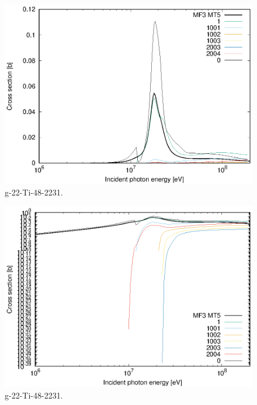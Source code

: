 \begin{figure}
 \includegraphics[width=\linewidth]{eps/g_22-Ti-48_2231.eps}
  \caption{g-22-Ti-48-2231.}
\end{figure}
\begin{figure}
 \includegraphics[width=\linewidth]{eps-log/g_22-Ti-48_2231.eps}
 \caption{g-22-Ti-48-2231.}
\end{figure}
\newpage \clearpage

